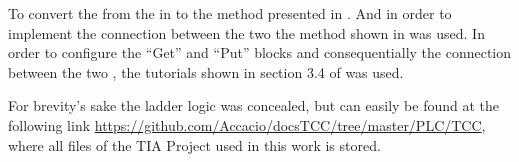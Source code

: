 

To convert the \CIPN{} from the  in to \LD{} the method
presented in . And in order to implement the connection
between the two \PLCs{} the method shown in  was used.
In order to configure the ``Get'' and ``Put'' blocks and consequentially the
connection between the two \PLCs, the tutorials shown in
section 3.4 of \cite{rochapereira2019automacao} was used.

For
brevity's sake the ladder logic was concealed, but can easily be
found at the following link
\url{https://github.com/Accacio/docsTCC/tree/master/PLC/TCC}, where all files of the TIA
Project used in this work is stored.




